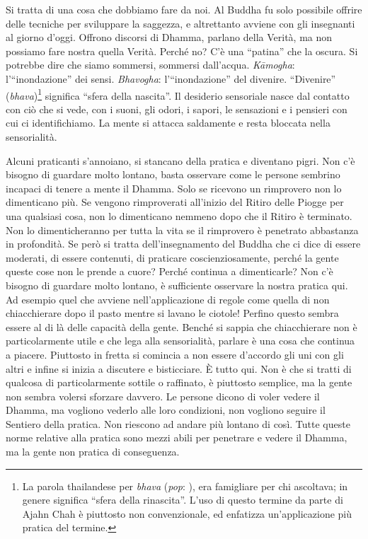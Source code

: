 Si tratta di una cosa che dobbiamo fare da noi. Al Buddha fu solo
possibile offrire delle tecniche per sviluppare la saggezza, e
altrettanto avviene con gli insegnanti al giorno d'oggi. Offrono
discorsi di Dhamma, parlano della Verità, ma non possiamo fare nostra
quella Verità. Perché no? C'è una ``patina'' che la oscura. Si potrebbe
dire che siamo sommersi, sommersi dall'acqua. \emph{Kāmogha}:
l'``inondazione'' dei sensi. \emph{Bhavogha}: l'``inondazione'' del
divenire. ``Divenire'' (\emph{bhava})\footnote{La parola thailandese per
  \emph{bhava} (\emph{pop}: ), era famigliare per chi
  ascoltava; in genere significa ``sfera della rinascita''. L'uso di
  questo termine da parte di Ajahn Chah è piuttosto non convenzionale,
  ed enfatizza un'applicazione più pratica del termine.} significa
``sfera della nascita''. Il desiderio sensoriale nasce dal contatto con
ciò che si vede, con i suoni, gli odori, i sapori, le sensazioni e i
pensieri con cui ci identifichiamo. La mente si attacca saldamente e
resta bloccata nella sensorialità.

Alcuni praticanti s'annoiano, si stancano della pratica e diventano
pigri. Non c'è bisogno di guardare molto lontano, basta osservare come
le persone sembrino incapaci di tenere a mente il Dhamma. Solo se
ricevono un rimprovero non lo dimenticano più. Se vengono rimproverati
all'inizio del Ritiro delle Piogge per una qualsiasi cosa, non lo
dimenticano nemmeno dopo che il Ritiro è terminato. Non lo
dimenticheranno per tutta la vita se il rimprovero è penetrato
abbastanza in profondità. Se però si tratta dell'insegnamento del Buddha
che ci dice di essere moderati, di essere contenuti, di praticare
coscienziosamente, perché la gente queste cose non le prende a cuore?
Perché continua a dimenticarle? Non c'è bisogno di guardare molto
lontano, è sufficiente osservare la nostra pratica qui. Ad esempio quel
che avviene nell'applicazione di regole come quella di non chiacchierare
dopo il pasto mentre si lavano le ciotole! Perfino questo sembra essere
al di là delle capacità della gente. Benché si sappia che chiacchierare
non è particolarmente utile e che lega alla sensorialità, parlare è una
cosa che continua a piacere. Piuttosto in fretta si comincia a non
essere d'accordo gli uni con gli altri e infine si inizia a discutere e
bisticciare. È tutto qui. Non è che si tratti di qualcosa di
particolarmente sottile o raffinato, è piuttosto semplice, ma la gente
non sembra volersi sforzare davvero. Le persone dicono di voler vedere
il Dhamma, ma vogliono vederlo alle loro condizioni, non vogliono
seguire il Sentiero della pratica. Non riescono ad andare più lontano di
così. Tutte queste norme relative alla pratica sono mezzi abili per
penetrare e vedere il Dhamma, ma la gente non pratica di conseguenza.

